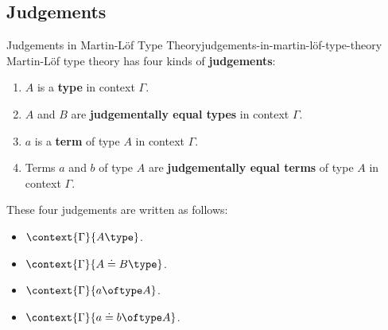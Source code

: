 \subsection{Judgements}\label{subsection-the-judgements-of-martin-löf-type-theory}
\begin{definition}{Judgements in Martin-Löf Type Theory}{judgements-in-martin-löf-type-theory}%
    Martin-Löf type theory has four kinds of \textbf{judgements}:
    \begin{enumerate}
        \item\label{martin-löf-type-theory-being-a-type}$A$ is a \textbf{type} in context $\Gamma$.
        \item\label{martin-löf-type-theory-being-judgementally-equal-types}$A$ and $B$ are \textbf{judgementally equal types} in context $\Gamma$.
        \item\label{martin-löf-type-theory-being-a-term}$a$ is a \textbf{term} of type $A$ in context $\Gamma$.
        \item\label{martin-löf-type-theory-being-judgementally-equal-terms}Terms $a$ and $b$ of type $A$ are \textbf{judgementally equal terms} of type $A$ in context $\Gamma$.
    \end{enumerate}
    These four judgements are written as follows:
    \begin{itemize}
        \item $\context{\Gamma}{A\type}$.
        \item $\context{\Gamma}{A\doteq B\type}$.
        \item $\context{\Gamma}{a\oftype A}$.
        \item $\context{\Gamma}{a\doteq b\oftype A}$.
    \end{itemize}
\end{definition}
